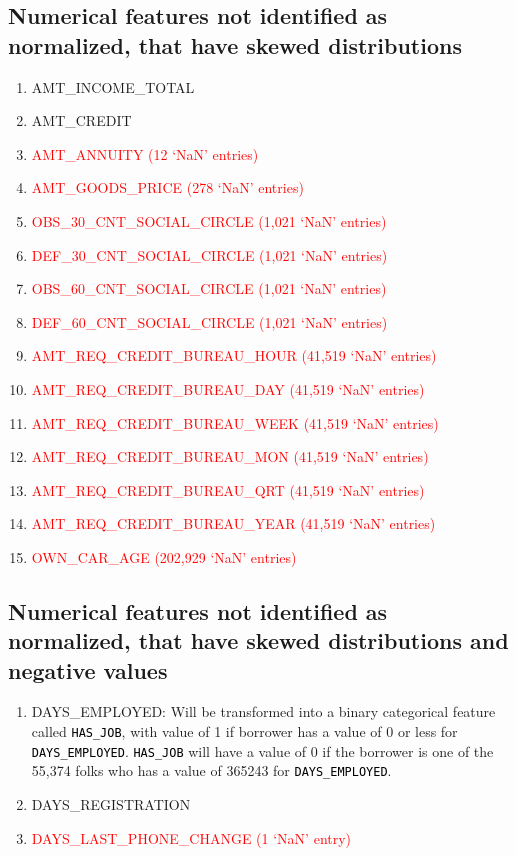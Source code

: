 \documentclass[12pt, letterpaper]{article}
\begin{document}
\begin{appendices}
\subsection{Numerical features not identified as normalized, that have skewed distributions}
\label{numericalfeatnotnormalizedskewed}
\footnotesize
\begin{enumerate}
 \item AMT_INCOME_TOTAL
 \item AMT_CREDIT
 \item \textcolor{red}{AMT_ANNUITY (12 `NaN' entries)}
 \item \textcolor{red}{AMT_GOODS_PRICE (278 `NaN' entries)}
 \item \textcolor{red}{OBS_30_CNT_SOCIAL_CIRCLE (1,021 `NaN' entries)}
 \item \textcolor{red}{DEF_30_CNT_SOCIAL_CIRCLE (1,021 `NaN' entries)}
 \item \textcolor{red}{OBS_60_CNT_SOCIAL_CIRCLE (1,021 `NaN' entries)}
 \item \textcolor{red}{DEF_60_CNT_SOCIAL_CIRCLE (1,021 `NaN' entries)}
 \item \textcolor{red}{AMT_REQ_CREDIT_BUREAU_HOUR (41,519 `NaN' entries)}
 \item \textcolor{red}{AMT_REQ_CREDIT_BUREAU_DAY (41,519 `NaN' entries)}
 \item \textcolor{red}{AMT_REQ_CREDIT_BUREAU_WEEK (41,519 `NaN' entries)}
 \item \textcolor{red}{AMT_REQ_CREDIT_BUREAU_MON (41,519 `NaN' entries)}
 \item \textcolor{red}{AMT_REQ_CREDIT_BUREAU_QRT (41,519 `NaN' entries)}
 \item \textcolor{red}{AMT_REQ_CREDIT_BUREAU_YEAR (41,519 `NaN' entries)}
 \item \textcolor{red}{OWN_CAR_AGE (202,929 `NaN' entries)}
\end{enumerate}
\normalsize

\subsection{Numerical features not identified as normalized, that have skewed distributions and negative values}
\label{numericalfeatnotnormalizedskewedneg}
\footnotesize
\begin{enumerate}
  \item DAYS_EMPLOYED: Will be transformed into a binary categorical feature called \colorbox{backcolor}{\textcolor{black}{\texttt{HAS_JOB}}}, with value of 1 if borrower has a value of 0 or less for \colorbox{backcolor}{\textcolor{black}{\texttt{DAYS_EMPLOYED}}}. \colorbox{backcolor}{\textcolor{black}{\texttt{HAS_JOB}}} will have a value of 0 if the borrower is one of the 55,374 folks who has a value of 365243 for \colorbox{backcolor}{\textcolor{black}{\texttt{DAYS_EMPLOYED}}}.
  \item DAYS_REGISTRATION
  \item \textcolor{red}{DAYS_LAST_PHONE_CHANGE (1 `NaN' entry)}
\end{enumerate}
\normalsize


\end{appendices}
\end{document}

